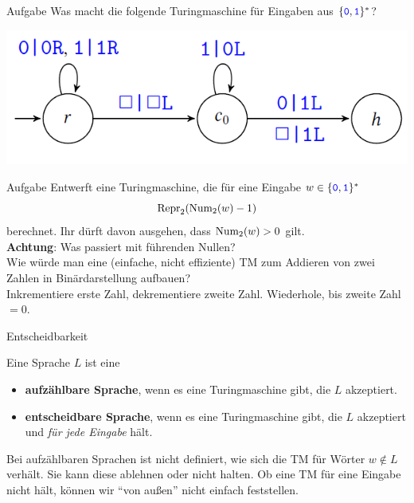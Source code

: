 \begin{frame}{Aufgabe}
	Was macht die folgende Turingmaschine für Eingaben aus $\{\hbox{\textcolor{blue}{\texttt{0}}}, \hbox{\textcolor{blue}{\texttt{1}}}\}^*$?
	
	\smallskip
	\includegraphics[scale=0.65]{turing/addBin1}
	
	\smallskip
\end{frame}


\begin{frame}{Aufgabe}
	Entwerft eine Turingmaschine, die für eine Eingabe $w \in \{\hbox{\textcolor{blue}{\texttt{0}}}, \hbox{\textcolor{blue}{\texttt{1}}}\}^*$ $$\text{Repr}_2({\text{Num}}_2(w) - 1)$$ berechnet. Ihr dürft davon ausgehen, dass ${\text{Num}}_2(w) > 0$ gilt.\\
	\pause
	\textbf{Achtung}: Was passiert mit führenden Nullen?\\
	
	\bigskip
	Wie würde man eine (einfache, nicht effiziente) TM zum Addieren von zwei Zahlen in Binärdarstellung aufbauen? \\ \pause
	\smallskip
	\impl Inkrementiere erste Zahl, dekrementiere zweite Zahl. Wiederhole, bis zweite Zahl $= 0$.
\end{frame}


\begin{frame}{Entscheidbarkeit}
	\begin{Definition}
		Eine Sprache $L$ ist eine   
		\begin{itemize}[<+->]
			\item \textbf{aufzählbare Sprache}, wenn es eine Turingmaschine gibt, die $L$ akzeptiert.
			\item \textbf{entscheidbare Sprache}, wenn es eine Turingmaschine gibt, die $L$ akzeptiert und \emph{für jede Eingabe} hält.
		\end{itemize}
	\end{Definition} \pause
	
	Bei aufzählbaren Sprachen ist nicht definiert, wie sich die TM für Wörter $ w \notin L$ verhält. Sie kann diese ablehnen oder nicht halten. Ob eine TM für eine Eingabe nicht hält, können wir \enquote{von außen} nicht einfach feststellen.
\end{frame}


